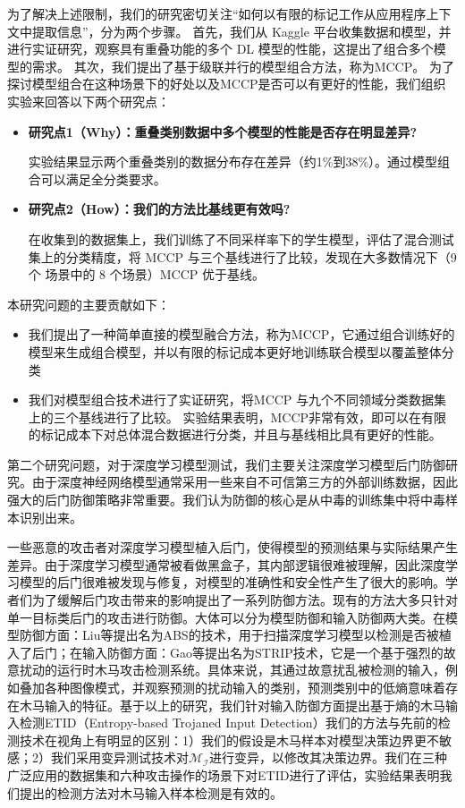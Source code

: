 \documentclass[fontset=macnew,UTF8]{article} %
\begin{document}
为了解决上述限制，我们的研究密切关注“如何以有限的标记工作从应用程序上下文中提取信息”，分为两个步骤。 首先，我们从 Kaggle 平台收集数据和模型，并进行实证研究，观察具有重叠功能的多个 DL 模型的性能，这提出了组合多个模型的需求。 其次，我们提出了基于级联并行的模型组合方法，称为MCCP。 为了探讨模型组合在这种场景下的好处以及MCCP是否可以有更好的性能，我们组织实验来回答以下两个研究点：

\begin{itemize}
	\item \textbf{研究点1（Why）：重叠类别数据中多个模型的性能是否存在明显差异?} 
	
	实验结果显示两个重叠类别的数据分布存在差异（约1\%到38\%）。通过模型组合可以满足全分类要求。
	
	\item  \textbf{研究点2（How）：我们的方法比基线更有效吗?} 
	
	在收集到的数据集上，我们训练了不同采样率下的学生模型，评估了混合测试集上的分类精度，将 MCCP 与三个基线进行了比较，发现在大多数情况下（9 个 场景中的 8 个场景）MCCP 优于基线。
\end{itemize}

本研究问题的主要贡献如下：

\begin{itemize}
	\item 我们提出了一种简单直接的模型融合方法，称为MCCP，它通过组合训练好的模型来生成组合模型，并以有限的标记成本更好地训练联合模型以覆盖整体分类
	\item  	我们对模型组合技术进行了实证研究，将MCCP 与九个不同领域分类数据集上的三个基线进行了比较。 实验结果表明，MCCP非常有效，即可以在有限的标记成本下对总体混合数据进行分类，并且与基线相比具有更好的性能。
\end{itemize}





第二个研究问题，对于深度学习模型测试，我们主要关注深度学习模型后门防御研究。由于深度神经网络模型通常采用一些来自不可信第三方的外部训练数据，因此强大的后门防御策略非常重要。我们认为防御的核心是从中毒的训练集中将中毒样本识别出来。

一些恶意的攻击者对深度学习模型植入后门\cite{liu2020survey,kaviani2021defense,li2022backdoor}，使得模型的预测结果与实际结果产生差异。由于深度学习模型通常被看做黑盒子，其内部逻辑很难被理解，因此深度学习模型的后门很难被发现与修复，对模型的准确性和安全性产生了很大的影响。学者们为了缓解后门攻击带来的影响提出了一系列防御方法。现有的方法大多只针对单一目标类后门的攻击进行防御。大体可以分为模型防御和输入防御两大类。在模型防御方面：Liu等\cite{liu2019abs}提出名为ABS的技术，用于扫描深度学习模型以检测是否被植入了后门；在输入防御方面：Gao等\cite{gao2019strip}提出名为STRIP技术，它是一个基于强烈的故意扰动的运行时木马攻击检测系统。具体来说，其通过故意扰乱被检测的输入，例如叠加各种图像模式，并观察预测的扰动输入的类别，预测类别中的低熵意味着存在木马输入的特征。基于以上的研究，我们针对输入防御方面提出基于熵的木马输入检测ETID（Entropy-based Trojaned Input Detection）我们的方法与先前的检测技术在视角上有明显的区别：1）我们的假设是木马样本对模型决策边界更不敏感；2）我们采用变异测试技术对$\mathcal{M}_\mathcal{I}$进行变异，以修改其决策边界。我们在三种广泛应用的数据集和六种攻击操作的场景下对ETID进行了评估，实验结果表明我们提出的检测方法对木马输入样本检测是有效的。
\end{document}
